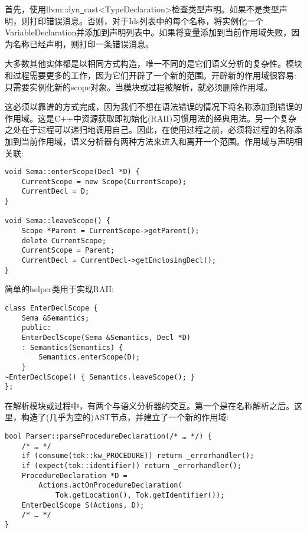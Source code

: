 首先，使用llvm::dyn\underline{~}cast<TypeDeclaration>检查类型声明。如果不是类型声明，则打印错误消息。否则，对于Ids列表中的每个名称，将实例化一个VariableDeclaration并添加到声明列表中。如果将变量添加到当前作用域失败，因为名称已经声明，则打印一条错误消息。\par

大多数其他实体都是以相同方式构造，唯一不同的是它们语义分析的复杂性。模块和过程需要更多的工作，因为它们开辟了一个新的范围。开辟新的作用域很容易:只需要实例化新的scope对象。当模块或过程被解析，就必须删除作用域。\par

这必须以靠谱的方式完成，因为我们不想在语法错误的情况下将名称添加到错误的作用域。这是C++中资源获取即初始化(RAII)习惯用法的经典用法。另一个复杂之处在于过程可以递归地调用自己。因此，在使用过程之前，必须将过程的名称添加到当前作用域，语义分析器有两种方法来进入和离开一个范围。作用域与声明相关联:\par

\begin{lstlisting}[caption={}]
void Sema::enterScope(Decl *D) {
	CurrentScope = new Scope(CurrentScope);
	CurrentDecl = D;
}

void Sema::leaveScope() {
	Scope *Parent = CurrentScope->getParent();
	delete CurrentScope;
	CurrentScope = Parent;
	CurrentDecl = CurrentDecl->getEnclosingDecl();
}
\end{lstlisting}

简单的helper类用于实现RAII:\par

\begin{lstlisting}[caption={}]
class EnterDeclScope {
	Sema &Semantics;
	public:
	EnterDeclScope(Sema &Semantics, Decl *D)
	: Semantics(Semantics) {
		Semantics.enterScope(D);
	}
~EnterDeclScope() { Semantics.leaveScope(); }
};
\end{lstlisting}

在解析模块或过程中，有两个与语义分析器的交互。第一个是在名称解析之后。这里，构造了(几乎为空的)AST节点，并建立了一个新的作用域:\par

\begin{lstlisting}[caption={}]
bool Parser::parseProcedureDeclaration(/* … */) {
	/* … */
	if (consume(tok::kw_PROCEDURE)) return _errorhandler();
	if (expect(tok::identifier)) return _errorhandler();
	ProcedureDeclaration *D =
		Actions.actOnProcedureDeclaration(
			Tok.getLocation(), Tok.getIdentifier());
	EnterDeclScope S(Actions, D);
	/* … */
}
\end{lstlisting}

